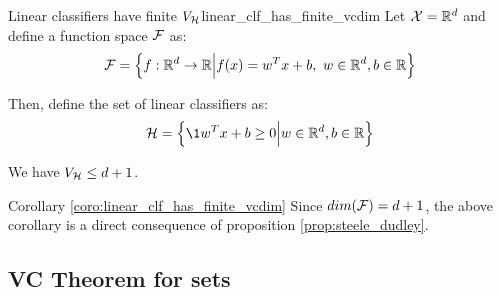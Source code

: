 \begin{corollary}{Linear classifiers have finite $V_{\mathcal{H}}$}{linear_clf_has_finite_vcdim}
    Let $\mathcal{X}=\mathbb{R}^d$ and define a function space $\mathcal{F}$ as:
    \begin{align*}
        \mathcal{F} = \Big\{ 
            f:\mathbb{R}^d\to\mathbb{R} \Big| f(x) = w^Tx + b, \ w\in\mathbb{R}^d, b\in\mathbb{R}
         \Big\}
    \end{align*}

    \noindent Then, define the set of linear classifiers as:
    \begin{align*}
        \Hf = \bigCurl{
            \1{w^Tx+b\ge 0} \Big| w\in \R^d, b\in\R
        }
    \end{align*}

    \noindent We have $V_{\mathcal{H}}\le d+1$.
\end{corollary}

\begin{proof*}{Corollary \ref{coro:linear_clf_has_finite_vcdim}}
    Since $dim(\mathcal{F})=d+1$, the above corollary is a direct consequence of proposition \ref{prop:steele_dudley}.
\end{proof*}


\subsection{VC Theorem for sets}




